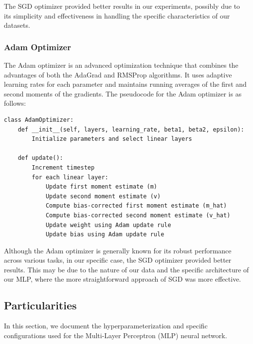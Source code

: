 \documentclass[a4paper,12pt]{article}
\begin{document}
The SGD optimizer provided better results in our experiments, possibly due to its simplicity and effectiveness in handling the specific characteristics of our datasets.

\subsubsection{Adam Optimizer}
The Adam optimizer is an advanced optimization technique that combines the advantages of both the AdaGrad and RMSProp algorithms. It uses adaptive learning rates for each parameter and maintains running averages of the first and second moments of the gradients. The pseudocode for the Adam optimizer is as follows:

\begin{verbatim}
class AdamOptimizer:
    def __init__(self, layers, learning_rate, beta1, beta2, epsilon):
        Initialize parameters and select linear layers

    def update():
        Increment timestep
        for each linear layer:
            Update first moment estimate (m)
            Update second moment estimate (v)
            Compute bias-corrected first moment estimate (m_hat)
            Compute bias-corrected second moment estimate (v_hat)
            Update weight using Adam update rule
            Update bias using Adam update rule
\end{verbatim}

Although the Adam optimizer is generally known for its robust performance across various tasks, in our specific case, the SGD optimizer provided better results. This may be due to the nature of our data and the specific architecture of our MLP, where the more straightforward approach of SGD was more effective.


\subsection{Particularities}

In this section, we document the hyperparameterization and specific configurations used for the Multi-Layer Perceptron (MLP) neural network.
\end{document}
